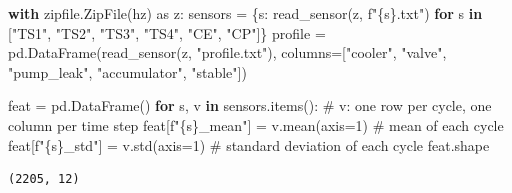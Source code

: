 \documentclass[
  letterpaper,
  DIV=11,
  numbers=noendperiod]{scrreprt}
\newenvironment{Shaded}{\begin{snugshade}}{\end{snugshade}}
\newcommand{\CommentTok}[1]{\textcolor[rgb]{0.37,0.37,0.37}{#1}}
\newcommand{\ControlFlowTok}[1]{\textcolor[rgb]{0.00,0.23,0.31}{\textbf{#1}}}
\newcommand{\DecValTok}[1]{\textcolor[rgb]{0.68,0.00,0.00}{#1}}
\newcommand{\ImportTok}[1]{\textcolor[rgb]{0.00,0.46,0.62}{#1}}
\newcommand{\KeywordTok}[1]{\textcolor[rgb]{0.00,0.23,0.31}{\textbf{#1}}}
\newcommand{\NormalTok}[1]{\textcolor[rgb]{0.00,0.23,0.31}{#1}}
\newcommand{\OperatorTok}[1]{\textcolor[rgb]{0.37,0.37,0.37}{#1}}
\newcommand{\SpecialCharTok}[1]{\textcolor[rgb]{0.37,0.37,0.37}{#1}}
\newcommand{\SpecialStringTok}[1]{\textcolor[rgb]{0.13,0.47,0.30}{#1}}
\newcommand{\StringTok}[1]{\textcolor[rgb]{0.13,0.47,0.30}{#1}}
\begin{document}
\begin{Shaded}
\begin{Highlighting}[]
\ControlFlowTok{with}\NormalTok{ zipfile.ZipFile(hz) }\ImportTok{as}\NormalTok{ z:}
\NormalTok{    sensors }\OperatorTok{=}\NormalTok{ \{s: read\_sensor(z, }\SpecialStringTok{f"}\SpecialCharTok{\{}\NormalTok{s}\SpecialCharTok{\}}\SpecialStringTok{.txt"}\NormalTok{) }\ControlFlowTok{for}\NormalTok{ s }\KeywordTok{in}\NormalTok{ [}\StringTok{"TS1"}\NormalTok{, }\StringTok{"TS2"}\NormalTok{, }\StringTok{"TS3"}\NormalTok{, }\StringTok{"TS4"}\NormalTok{, }\StringTok{"CE"}\NormalTok{, }\StringTok{"CP"}\NormalTok{]\}}
\NormalTok{    profile }\OperatorTok{=}\NormalTok{ pd.DataFrame(read\_sensor(z, }\StringTok{"profile.txt"}\NormalTok{),}
\NormalTok{                           columns}\OperatorTok{=}\NormalTok{[}\StringTok{"cooler"}\NormalTok{, }\StringTok{"valve"}\NormalTok{, }\StringTok{"pump\_leak"}\NormalTok{, }\StringTok{"accumulator"}\NormalTok{, }\StringTok{"stable"}\NormalTok{])}

\NormalTok{feat }\OperatorTok{=}\NormalTok{ pd.DataFrame()}
\ControlFlowTok{for}\NormalTok{ s, v }\KeywordTok{in}\NormalTok{ sensors.items():                     }\CommentTok{\# v: one row per cycle, one column per time step}
\NormalTok{    feat[}\SpecialStringTok{f"}\SpecialCharTok{\{}\NormalTok{s}\SpecialCharTok{\}}\SpecialStringTok{\_mean"}\NormalTok{] }\OperatorTok{=}\NormalTok{ v.mean(axis}\OperatorTok{=}\DecValTok{1}\NormalTok{)           }\CommentTok{\# mean of each cycle}
\NormalTok{    feat[}\SpecialStringTok{f"}\SpecialCharTok{\{}\NormalTok{s}\SpecialCharTok{\}}\SpecialStringTok{\_std"}\NormalTok{] }\OperatorTok{=}\NormalTok{ v.std(axis}\OperatorTok{=}\DecValTok{1}\NormalTok{)             }\CommentTok{\# standard deviation of each cycle}
\NormalTok{feat.shape}
\end{Highlighting}
\end{Shaded}

\begin{verbatim}
(2205, 12)
\end{verbatim}
\end{document}
